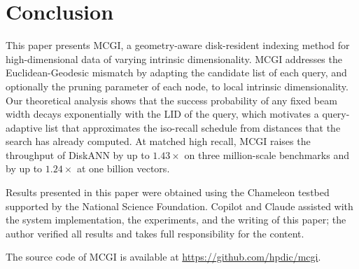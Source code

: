 \documentclass{article}
\theoremstyle{plain}
\theoremstyle{definition}
\theoremstyle{remark}
\begin{document}
\section{Conclusion}

This paper presents MCGI, a geometry-aware disk-resident indexing method for high-dimensional data of varying intrinsic dimensionality.
MCGI addresses the Euclidean-Geodesic mismatch by adapting the candidate list of each query, and optionally the pruning parameter of each node, to local intrinsic dimensionality. Our theoretical analysis shows that the success probability of any fixed beam width decays exponentially with the LID of the query, which motivates a query-adaptive list that approximates the iso-recall schedule from distances that the search has already computed. At matched high recall, MCGI raises the throughput of DiskANN by up to $1.43\times$ on three million-scale benchmarks and by up to $1.24\times$ at one billion vectors.


\begin{ack}
Results presented in this paper were obtained using the Chameleon testbed supported by the National Science Foundation.
Copilot and Claude assisted with the system implementation, the experiments, and the writing of this paper; the author verified all results and takes full responsibility for the content. 

The source code of MCGI is available at \url{https://github.com/hpdic/mcgi}. 
\end{ack}




\clearpage

\end{document}
